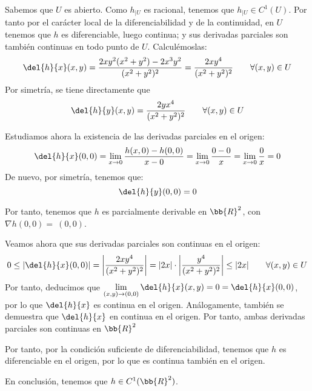 \begin{ejercicio}
\begin{enumerate}
        Sabemos que $U$ es abierto. Como $h_{\big| U}$ es racional, tenemos que $h_{\big|U}\in C^1(U)$. Por tanto por el carácter local de la diferenciabilidad y de la continuidad, en $U$ tenemos que $h$ es diferenciable, luego continua; y sus derivadas parciales son también continuas en todo punto de $U$. Calculémoslas:
        \begin{equation*}
            \del{h}{x} (x,y) = \frac{2xy^2(x^2+y^2) - 2x^3y^2}{(x^2+y^2)^2}
            = \frac{2xy^4}{(x^2+y^2)^2} \qquad \forall (x,y)\in U
        \end{equation*}
        Por simetría, se tiene directamente que
        \begin{equation*}
            \del{h}{y} (x,y) = \frac{2yx^4}{(x^2+y^2)^2}  \qquad \forall (x,y)\in U
        \end{equation*}
    
        Estudiamos ahora la existencia de las derivadas parciales en el origen:
        \begin{equation*}
            \del{h}{x}(0,0) = \lim_{x\to 0}\frac{h(x,0)-h(0,0)}{x-0} = \lim_{x\to 0}\frac{0-0}{x} = \lim_{x\to 0}\frac{0}{x} = 0
        \end{equation*}
        De nuevo, por simetría, tenemos que:
        \begin{equation*}
            \del{h}{y}(0,0) = 0
        \end{equation*}

        Por tanto, tenemos que $h$ es parcialmente derivable en $\bb{R}^2$, con $\nabla h(0,0) =~(0,0)$.

        Veamos ahora que sus derivadas parciales son continuas en el origen:
        \begin{equation*}
            0\leq \left|\del{h}{x}(0,0)\right| = \left|\frac{2xy^4}{(x^2+y^2)^2}\right| = |2x|\cdot \left|\frac{y^4}{(x^2+y^2)^2}\right| \leq |2x| \qquad \forall (x,y)\in U
        \end{equation*}
        Por tanto, deducimos que $\lim\limits_{(x,y)\to (0,0)}\del{h}{x}(x,y) = 0 = \del{h}{x}(0,0)$, por lo que $\del{h}{x}$ es continua en el origen. Análogamente, también se demuestra que $\del{h}{x}$ en continua en el origen. Por tanto, ambas derivadas parciales son continuas en $\bb{R}^2$

        Por tanto, por la condición suficiente de diferenciabilidad, tenemos que $h$ es diferenciable en el origen, por lo que es continua también en el origen.

        En conclusión, tenemos que $h\in C^1(\bb{R}^2)$.
    \end{enumerate}
\end{ejercicio}


